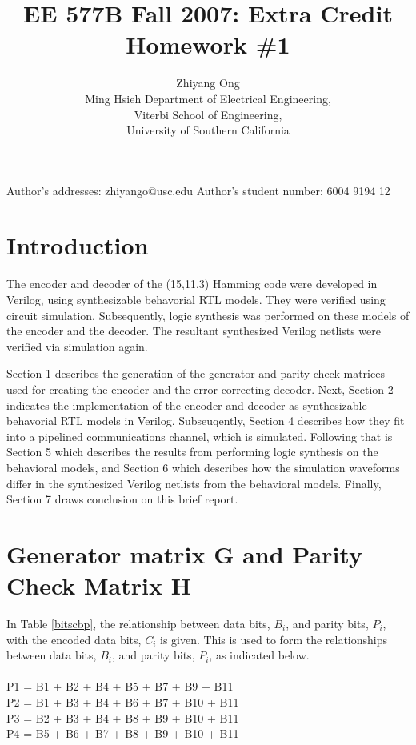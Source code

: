 \documentclass[ee577b,acmnow]{acmtrans2m}
\title{EE 577B Fall 2007: Extra Credit Homework \#1}
\author{Zhiyang Ong\\
Ming Hsieh Department of Electrical Engineering,\\
Viterbi School of Engineering,\\
University of Southern California
}
\begin{document}
\setcounter{page}{1}
            
\begin{bottomstuff} 
Author's addresses: zhiyango@usc.edu \newline
Author's student number: 6004 9194 12 \newline
\end{bottomstuff}
            
\maketitle

\section{Introduction}

The encoder and decoder of the (15,11,3) Hamming code \cite{Weste05} were
developed in Verilog, using synthesizable behavorial RTL models.
They were verified using circuit simulation. Subsequently,
logic synthesis was performed on these models of the encoder
and the decoder. The resultant synthesized Verilog netlists
were verified via simulation again.

Section 1 describes the generation of the generator and parity-check
matrices used for creating the encoder and the error-correcting decoder.
Next, Section 2 indicates the implementation of the encoder and decoder as
synthesizable behavorial RTL models in Verilog. Subseuqently, Section 4
describes how they fit into a pipelined communications channel, which
is simulated. Following that is Section 5 which describes the results
from performing logic synthesis on the behavioral models, and Section
6 which describes how the simulation waveforms differ in the synthesized
Verilog netlists from the behavioral models. Finally, Section 7 draws
conclusion on this brief report.

\section{Generator matrix G and Parity Check Matrix H}

In Table \ref{bitscbp}, the relationship between data bits, $B_{i}$, and parity bits, $P_{i}$, with the encoded data bits, $C_{i}$ is given. This is used to form the relationships between data bits, $B_{i}$, and parity bits, $P_{i}$, as indicated below.\\
\ \\
P1 = B1 + B2 + B4 + B5 + B7 + B9 + B11\\
P2 = B1 + B3 + B4 + B6 + B7 + B10 + B11\\
P3 = B2 + B3 + B4 + B8 + B9 + B10 + B11\\
P4 = B5 + B6 + B7 + B8 + B9 + B10 + B11\\
\end{document}
